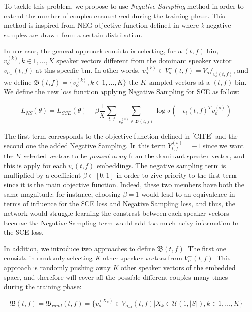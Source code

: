 \documentclass[master, tikz, final,11pt, dvipdfmx]{iscs-thesis}
\begin{document}
To tackle this problem, we propose to use \textit{Negative Sampling} method in order to extend the number of couples encountered during the training phase. This method is inspired from NEG objective function  defined in \cite{NS} where \textit{k} negative samples are drawn from a certain distribution. 

In our case, the general approach consists in selecting, for a $(t,f)$ bin, $v_o^{(k)}, k \in 1,\dotsc,K$ speaker vectors different from the dominant speaker vector $v_{o_{+}}(t,f)$ at this specific bin. In other words, $v_o^{(k)} \in V_o^-(t,f) = V_o/_{v_o^+(t,f)}$, and we define $\mathfrak{B}(t,f) = \{v_o^{(k)}, k \in 1,\dotsc,K\}$ the $K$ sampled vectors at a $(t,f)$ bin. We define the new loss function applying Negative Sampling for SCE as follow:


\[L_{NS}(\theta) = L_{SCE}(\theta) - \beta \frac{1}{K} \sum_{t,f} \sum_{v_o^{(s)} \in \mathfrak{B}(t,f)} \log \sigma(- v_i(t,f)^{T} v_o^{(s)}) \]

The first term corresponds to the objective function defined in [CITE] and the second one the added Negative Sampling. In this term $Y_{t,f}^{(s)} = -1$ since we want the $K$ selected vectors to be \textit{pushed away} from the dominant speaker vector, and this is apply for each $v_i(t,f)$ embeddings. The negative sampling term is multiplied by a coefficient $\beta \in[0,1]$ in order to give priority to the first term since it is the main objective function. Indeed, these two members have both the same magnitude: for instance, choosing $\beta = 1$ would lead to an equivalence in terms of influence for the SCE loss and Negative Sampling loss, and thus, the network would struggle learning the constrast between each speaker vectors because the Negative Sampling term would add too much noisy information to the SCE loss. 

In addition, we introduce two approaches to define $\mathfrak{B}(t,f)$. The first one consists in randomly selecting $K$ other speaker vectors from $V_o^-(t,f)$. This approach is randomly pushing away $K$ other speaker vectors of the embedded space, and therefore will cover all the possible different couples many times during the training phase:

\[\mathfrak{B}(t,f) = \mathfrak{B}_{rand}(t,f) = \{v_o^{(X_k)} \in V_{o_{-1}}(t,f) | X_k \in \mathcal{U}(1,|S|), k \in 1, \dotsc,K\} \]
\end{document}
